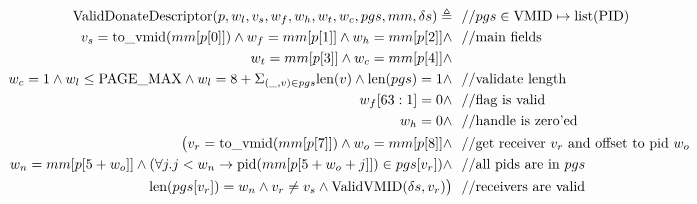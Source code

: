 \documentclass[a4paper]{article}
\newcommand*{\defined}{\triangleq}
\newcommand*{\PID}{\text{PID}}
\newcommand*{\VMID}{\text{VMID}}
\newcommand*{\PPMAX}{\text{PAGE\_MAX}}
\begin{document}
\begin{align*}
  \text{ValidDonateDescriptor}(p,w_l,v_s,w_f,w_h,w_t,w_c,pgs,mm,\delta s)\defined &~~//pgs \in \VMID \mapsto \text{list}(\PID)\\
  v_{s}=\tv{mm[p[0]]} \land w_{f}=mm[p[1]] \land w_{h}=mm[p[2]] \land &~~//\text{main fields}\\
   w_{t} = mm[p[3]] \land w_{c} = mm[p[4]] \land &~~ \\
   w_c = 1 \land w_l \le \PPMAX \land w_{l} = 8 + \Sigma_{(\_,v)\in pgs} \text{len}(v) \land \text{len}(pgs)=1 \land &~~//\text{validate length} \\
   w_f[63:1] = 0 \land &~~//\text{flag is valid} \\
   w_h = 0 \land&~~//\text{handle is zero'ed} \\
  \big(v_{r}=\tv{mm[p[7]]} \land w_{o} = mm[p[8]] \land &~~//\text{get receiver $v_{r}$ and offset to pid $w_{o}$ }\\
  w_{n}=mm[p[5+w_{o}]] \land (\forall j. j < w_{n}\rightarrow \text{pid}(mm[p[5+w_{o}+j]])\in pgs[v_{r}]) \land&~~//\text{all pids are in $pgs$} \\
  \text{len}(pgs[v_{r}])=w_{n}\land v_{r}\ne v_{s} \land \text{ValidVMID}(\delta s,v_{r})\big) &~~//\text{receivers are valid}
\end{align*}
    
\end{document}
